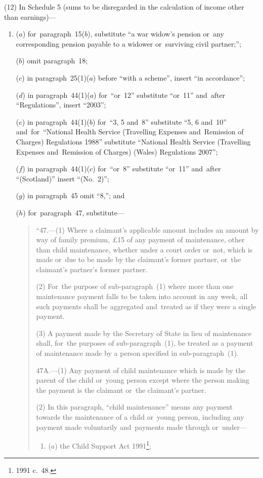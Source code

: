 \documentclass[12pt,a4paper]{article}
\begin{document}
(12) In Schedule 5 (sums to be disregarded in the calculation of income other than earnings)—
\begin{enumerate}\item[]
($a$) for~paragraph~15($b$), substitute “a war widow’s pension or~any corresponding pension payable to a widower or~surviving civil partner;”;

($b$) omit paragraph~18;

($c$) in paragraph~25(1)($a$)  before “with a scheme”, insert “in accordance”;

($d$) in paragraph~44(1)($a$)  for~“or~12” substitute “or~11” and~after “Regulations”, insert “2003”;

($e$) in paragraph~44(1)($b$)  for~“3, 5 and~8” substitute “5, 6 and~10” and~for~“National Health Service (Travelling Expenses and~Remission of Charges) Regulations 1988” substitute “National Health Service (Travelling Expenses and~Remission of Charges) (Wales) Regulations 2007”;

($f$) in paragraph~44(1)($c$)  for~“or~8” substitute “or~11” and~after “(Scotland)” insert “(No.~2)”;

($g$) in paragraph~45 omit “8,”; and

($h$) for~paragraph~47, substitute—
\begin{quotation}
“47.---(1)  Where a claimant’s applicable amount includes an amount by way of family premium, £15 of any payment of maintenance, other than child maintenance, whether under a court order or~not, which is made or~due to be made by the claimant’s former partner, or~the claimant’s partner’s former partner.

(2) For~the purpose of sub-paragraph~(1) where more than one maintenance payment falls to be taken into account in any week, all such payments shall be aggregated and~treated as if they were a single payment.

(3) A payment made by the Secretary of State in lieu of maintenance shall, for~the purposes of sub-paragraph~(1), be treated as a payment of maintenance made by a person specified in sub-paragraph~(1).

\medskip

47A.---(1)  Any payment of child maintenance which is made by the parent of the child or~young person except where the person making the payment is the claimant or~the claimant’s partner.

(2) In this paragraph, “child maintenance” means any payment towards the maintenance of a child or~young person, including any payment made voluntarily and~payments made through or~under—
\begin{enumerate}\item[]
($a$) the Child Support Act 1991\footnote{1991 c.~48.};


\end{enumerate}
\end{quotation}
\end{enumerate}
\end{document}
